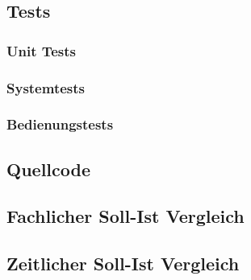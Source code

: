 \subsection{Tests}
  \blindtext
  \subsubsection{Unit Tests}
  \subsubsection{Systemtests}
  \subsubsection{Bedienungstests}
\subsection{Quellcode}
  \blindtext
\subsection{Fachlicher Soll-Ist Vergleich}
  \blindtext
\subsection{Zeitlicher Soll-Ist Vergleich}
  \blindtext
